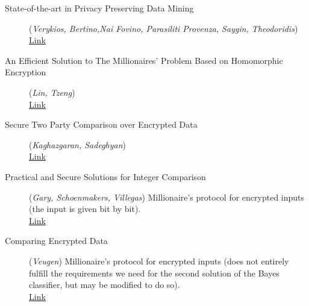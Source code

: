 \documentclass[11pt]{article}
\begin{document}
\begin{description}
	\item [State-of-the-art in Privacy Preserving Data Mining](\emph{Verykios, Bertino,Nai Fovino, Parasiliti Provenza, Saygin, Theodoridis})
	\\ \href{http://www.sigmod.org/publications/sigmod-record/0403/B1.bertion-sigmod-record2.pdf}{Link}
	
	\item [An Efficient Solution to The Millionaires' Problem Based on Homomorphic Encryption](\emph{Lin, Tzeng})
	\\ \href{http://eprint.iacr.org/2005/043.pdf}{Link}
	                
	\item [Secure Two Party Comparison over Encrypted Data](\emph{Kaghazgaran, Sadeghyan})
	\\ \href{http://ieeexplore.ieee.org/stamp/stamp.jsp?tp=&arnumber=6141405&tag=1}{Link} 
	
	\item [Practical and Secure Solutions for Integer Comparison](\emph{Gary, Schoenmakers, Villegas})
	Millionaire's protocol for encrypted inputs (the input is given bit by bit).
	\\ \href{http://www.win.tue.nl/~berry/papers/pkc07intcomp.pdf}{Link}   
	
	                                                                                             
	\item [Comparing Encrypted Data](\emph{Veugen}) \cite{Veugen}
 	Millionaire's protocol for encrypted inputs (does not entirely fulfill the requirements we need for the second solution of the Bayes classifier, but may be modified to do so).   
	\\ \href{http://msp.ewi.tudelft.nl/sites/default/files/Comparing%20encrypted%20data.pdf}{Link}
\end{description}





\newpage





\end{document}
